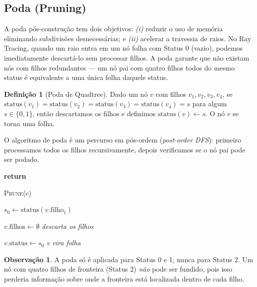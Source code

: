 \documentclass[11pt,a4paper]{article}
\newenvironment{algorithmic}[1][0]{%
    \begin{list}{}{%
        \setlength{\leftmargin}{1.5em}%
        \setlength{\labelsep}{0pt}%
        \setlength{\itemsep}{0pt}%
        \setlength{\topsep}{0pt}%
        \setlength{\parsep}{0pt}%
        \setlength{\partopsep}{0pt}%
    }%
}{%
    \end{list}%
}
\newcommand{\State}{\item[]}
\newcommand{\Procedure}[2]{\item[\textbf{procedure} #1(#2)]}
\newcommand{\EndProcedure}{\item[\textbf{end procedure}]}
\newcommand{\If}[1]{\item[\textbf{if} #1 \textbf{then}]}
\newcommand{\EndIf}{\item[\textbf{end if}]}
\newcommand{\For}[1]{\item[\textbf{for} #1 \textbf{do}]}
\newcommand{\EndFor}{\item[\textbf{end for}]}
\newcommand{\Return}{\textbf{return}~}
\newcommand{\Call}[2]{\textsc{#1}(#2)}
\newcommand{\Comment}[1]{\hfill\textit{#1}}
\theoremstyle{plain}
\theoremstyle{definition}
\newtheorem{definition}[theorem]{Definição}
\newtheorem{remark}[theorem]{Observação}
\begin{document}
\subsection{Poda (Pruning)}
\label{subsec:pruning}

\begin{tcolorbox}[motivacao]
A poda pós-construção tem dois objetivos: \emph{(i)} reduzir o uso de memória
eliminando subdivisões desnecessárias; e \emph{(ii)} acelerar a travessia de
raios. No Ray Tracing, quando um raio entra em um nó folha com Status 0 (vazio),
podemos imediatamente descartá-lo sem processar filhos. A poda garante que não
existam nós com filhos redundantes --- um nó pai com quatro filhos todos do
mesmo status é equivalente a uma única folha daquele status.
\end{tcolorbox}

\begin{definition}[Poda de Quadtree]
Dado um nó $v$ com filhos $v_1, v_2, v_3, v_4$, se
$\text{status}(v_1) = \text{status}(v_2) = \text{status}(v_3) = \text{status}(v_4) = s$
para algum $s \in \{0, 1\}$, então descartamos os filhos e definimos
$\text{status}(v) \gets s$. O nó $v$ se torna uma folha.
\end{definition}

O algoritmo de poda é um percurso em pós-ordem (\textit{post-order DFS}):
primeiro processamos todos os filhos recursivamente, depois verificamos se o nó
pai pode ser podado.

\begin{algorithm}[H]
\caption{Poda da Quadtree (post-order)}
\begin{algorithmic}[1]
\Procedure{Prune}{$v$}
    \If{$v$ é folha} \Return \EndIf
    \For{cada filho $c$ de $v$}
        \State \Call{Prune}{$c$}
    \EndFor
    \State $s_0 \gets \text{status}(v.\text{filho}_1)$
    \If{todos os filhos têm o mesmo status $s_0$ \textbf{and} $s_0 \neq 2$}
        \State $v.\text{filhos} \gets \emptyset$ \Comment{descarta os filhos}
        \State $v.\text{status} \gets s_0$    \Comment{v vira folha}
    \EndIf
\EndProcedure
\end{algorithmic}
\end{algorithm}

\begin{remark}
A poda só é aplicada para Status 0 e 1, nunca para Status 2. Um nó com quatro
filhos de fronteira (Status 2) \emph{não} pode ser fundido, pois isso perderia
informação sobre onde a fronteira está localizada dentro de cada filho.
\end{remark}
\end{document}

